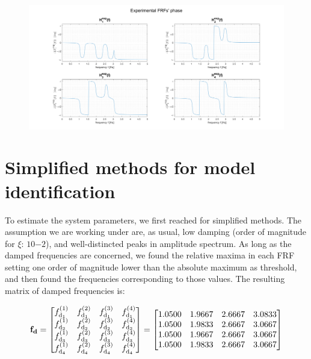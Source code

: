 \documentclass[a4paper,12pt,oneside]{article}
\begin{document}
\begin{figure}[H]
	\hspace{-70pt}
	\includegraphics[scale=0.4]{experimental_frfs_phase}
\end{figure}


\section{Simplified methods for model identification}
\label{sec:simplified_methods}

To estimate the system parameters, we first reached for simplified methods. The assumption we are working under are, as usual, low damping (order of magnitude for $ \xi $: $ 10{-2} $), and well-distincted peaks in amplitude spectrum. As long as the damped frequencies are concerned, we found the relative maxima in each FRF setting one order of magnitude lower than the absolute maximum as threshold, and then found the frequencies corresponding to those values. The resulting matrix of damped frequencies is:

\[
	\mathbf{f_d} =	\begin{bmatrix}
										f_{\textup{d}_1}^{(1)}	& f_{\textup{d}_1}^{(2)} &
											f_{\textup{d}_1}^{(3)}	& f_{\textup{d}_1}^{(4)} \\
										f_{\textup{d}_2}^{(1)}	& f_{\textup{d}_2}^{(2)} &
											f_{\textup{d}_2}^{(3)}	& f_{\textup{d}_2}^{(4)} \\
										f_{\textup{d}_3}^{(1)}	& f_{\textup{d}_3}^{(2)} &
											f_{\textup{d}_3}^{(3)}	& f_{\textup{d}_3}^{(4)} \\
										f_{\textup{d}_4}^{(1)}	& f_{\textup{d}_4}^{(2)} &
											f_{\textup{d}_4}^{(3)}	& f_{\textup{d}_4}^{(4)} \\
									\end{bmatrix} = \begin{bmatrix}
																		1.0500	& 1.9667	& 2.6667	& 3.0833 \\
																		1.0500	& 1.9833	& 2.6667	& 3.0667 \\
																		1.0500	& 1.9667	& 2.6667	& 3.0667 \\
																		1.0500	& 1.9833	& 2.6667	& 3.0667
																	\end{bmatrix}
\]
\end{document}
